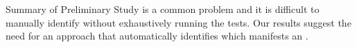 \begin{Summary}{Summary of Preliminary Study}{}
\inconsistent is a common problem and it is difficult to manually identify \inconsistent without exhaustively running the tests. Our results suggest the need for an approach that automatically identifies which \instance manifests an \inconsistent. 
\end{Summary}


